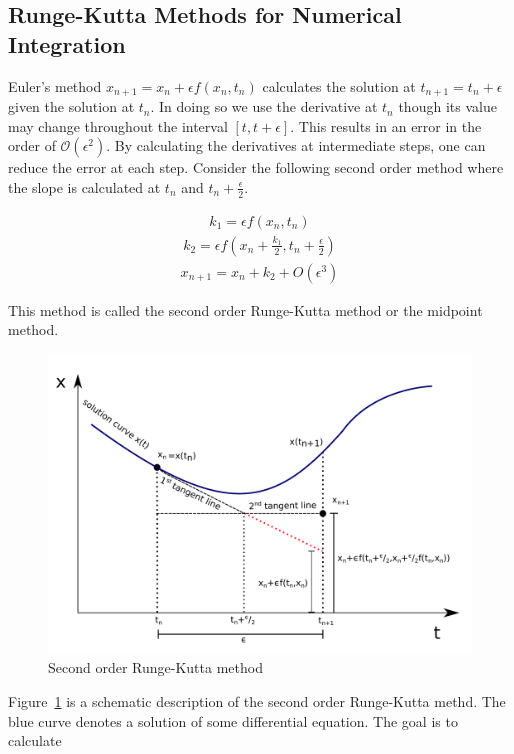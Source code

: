 \documentclass[10pt,letterpaper]{article}
\begin{document}
\subsection*{Runge-Kutta Methods for Numerical Integration}

Euler's method $x_{n+1}=x_n + \epsilon f(x_n,t_n)$ calculates the solution at $t_{n+1}=t_n+\epsilon$ given the solution at $t_n$. In doing so we use the derivative at $t_{n}$ though its value may change throughout the interval $[t,t+\epsilon]$.  This results in an error in the order of $\mathcal{O}(\epsilon^2)$. By calculating the derivatives at intermediate steps, one can reduce the error at each step. Consider the following second order method where the slope is calculated at $t_{n}$ and $t_n+\frac{\epsilon}{2}$.

\begin{eqnarray}k_1=\epsilon f(x_n,t_n)\end{eqnarray}
\begin{eqnarray}k_2=\epsilon f(x_n+\frac{k_1}{2},t_n+\frac{\epsilon}{2})\end{eqnarray}
\begin{eqnarray}x_{n+1}=x_n+k_2+O(\epsilon^3)\end{eqnarray}


This method is called the second order Runge-Kutta method or the midpoint method.
\begin{figure}
\includegraphics[scale=0.4]{Figures/fig4.pdf} 
\caption{Second order Runge-Kutta method}
\label{fig:RK2}
\end{figure}
Figure~\ref{fig:RK2} is a schematic description of the second order Runge-Kutta methd. The blue curve denotes a solution of some differential equation. The goal is to calculate 
\end{document}
